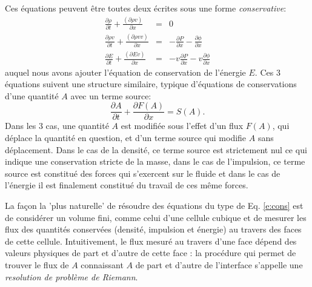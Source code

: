 Ces équations peuvent être toutes deux écrites sous une forme \textit{conservative}:
\begin{eqnarray}
\frac{\partial \rho}{\partial t}+\frac{(\partial \rho v)}{\partial x}&=&0\\
\frac{\partial \rho v}{\partial t}+\frac{(\partial \rho v v)}{\partial x}&=&-\frac{\partial P}{\partial x}-\frac{\partial \phi}{\partial x}\\
\frac{\partial E}{\partial t}+\frac{(\partial E v)}{\partial x}&=&-v \frac{\partial P}{\partial x}-v\frac{\partial \phi}{\partial x}
\end{eqnarray}
auquel nous avons ajouter l'équation de conservation de l'énergie $E$. Ces 3 équations suivent une structure similaire, typique d'équations de conservations d'une quantité $A$ avec un terme source:
\begin{equation}
\frac{\partial A}{\partial t}+\frac{\partial F(A)}{\partial x}=S(A).
\label{e:cons}
\end{equation}
Dans les 3 cas, une quantité $A$ est modifiée sous l'effet d'un flux $F(A)$, qui déplace la quantité en question, et d'un terme source qui modifie $A$ sans déplacement. Dans le cas de la densité, ce terme source est strictement nul ce qui indique une conservation stricte de la masse, dans le cas de l'impulsion, ce terme source est constitué des forces qui s'exercent sur le fluide et dans le cas de l'énergie il est finalement constitué du travail de ces même forces.

La façon la 'plus naturelle' de résoudre des équations du type de Eq. \ref{e:cons} est de considérer un volume fini, comme celui d'une cellule cubique et de mesurer les flux des quantités conservées (densité, impulsion et énergie) au travers des faces de cette cellule. Intuitivement, le flux mesuré au travers d'une face dépend des valeurs physiques de part et d'autre de cette face : la procédure qui permet de trouver le flux de $A$ connaissant $A$ de part et d'autre de l'interface s'appelle une \textit{resolution de problème de Riemann}.

